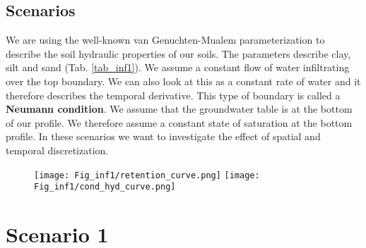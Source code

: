 \newpage
\subsection{Scenarios}

We are using the well-known van Genuchten-Mualem parameterization to describe the soil hydraulic properties of our soils. The parameters describe clay, silt and sand (Tab. \ref{tab_inf1}). We assume a constant flow of water infiltrating over the top boundary. We can also look at this as a constant rate of water and it therefore describes the temporal derivative. This type of boundary is called a \textbf{Neumann condition}. We assume that the groundwater table is at the bottom of our profile. We therefore assume a constant state of saturation at the bottom profile. In these scenarios we want to investigate the effect of spatial and temporal discretization.

\begin{table}[!h]
\centering
\caption{\label{tab_inf1}Material properties needed for scenarios.}
\end{table}
\begin{figure}[!h]
\centering
\texttt{[image: Fig\_inf1/retention\_curve.png]}
\texttt{[image: Fig\_inf1/cond\_hyd\_curve.png]}
\end{figure}

\section*{Scenario 1}

